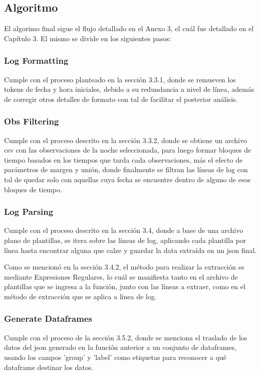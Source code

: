 
\subsection{Algoritmo}

El algorimo final sigue el flujo detallado en el Anexo 3, el cuál fue detallado en el Capítulo 3. El mismo se divide en los siguientes pasos:

\subsubsection{Log Formatting}
Cumple con el proceso planteado en la sección 3.3.1, donde se remueven los tokens de fecha y hora iniciales, debido a su redundancia a nivel de línea, además de corregir otros detalles de formato con tal de facilitar el posterior análisis.

\subsubsection{Obs Filtering} 
Cumple con el proceso descrito en la sección 3.3.2, donde se obtiene un archivo csv con las observaciones de la noche seleccionada, para luego formar bloques de tiempo basados en los tiempos que tarda cada observaciones, más el efecto de parámetros de margen y unión, donde finalmente se filtran las líneas de log con tal de quedar solo con aquellas cuya fecha se encuentre dentro de alguno de esos bloques de tiempo.

\subsubsection{Log Parsing}
Cumple con el proceso descrito en la sección 3.4, donde a base de una archivo plano de plantillas, se itera sobre las líneas de log, aplicando cada plantilla por línea hasta encontrar alguna que calze y guardar la data extraída en un json final.

Como se mencionó en la sección 3.4.2, el método para realizar la extracción es mediante Expresiones Regulares, lo cuál se manifiesta tanto en el archivo de plantillas que se ingresa a la función, junto con las líneas a extraer, como en el método de extracción que se aplica a línea de log.

\subsubsection{Generate Dataframes} 
Cumple con el proceso de la sección 3.5.2, donde se menciona el traslado de los datos del json generado en la función anterior a un conjunto de dataframes, usando los campos 'group' y 'label' como etiquetas para reconocer a qué dataframe destinar los datos.

